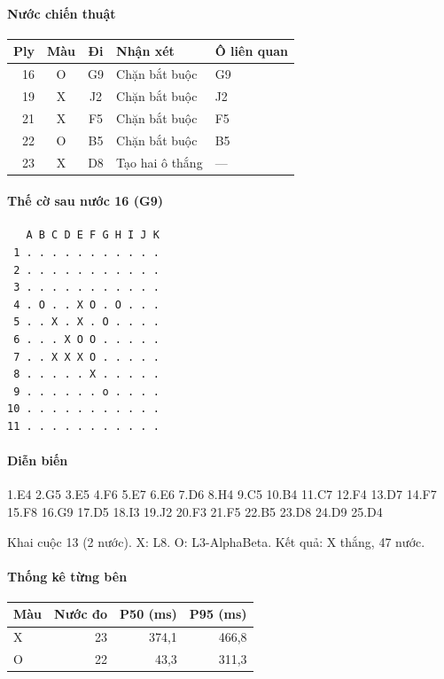 \paragraph{Nước chiến thuật}
\begin{center}\small
\begin{tabular}{@{}rccll@{}}
\toprule
Ply & Màu & Đi & Nhận xét & Ô liên quan \\
\midrule
16 & O & G9 & Chặn bắt buộc & G9 \\
19 & X & J2 & Chặn bắt buộc & J2 \\
21 & X & F5 & Chặn bắt buộc & F5 \\
22 & O & B5 & Chặn bắt buộc & B5 \\
23 & X & D8 & Tạo hai ô thắng & — \\
\bottomrule
\end{tabular}
\end{center}
\paragraph{Thế cờ sau nước 16 (G9)}
\begin{verbatim}
   A B C D E F G H I J K
 1 . . . . . . . . . . .
 2 . . . . . . . . . . .
 3 . . . . . . . . . . .
 4 . O . . X O . O . . .
 5 . . X . X . O . . . .
 6 . . . X O O . . . . .
 7 . . X X X O . . . . .
 8 . . . . . X . . . . .
 9 . . . . . . o . . . .
10 . . . . . . . . . . .
11 . . . . . . . . . . .
\end{verbatim}
\paragraph{Diễn biến}
{\footnotesize 1.E4 2.G5 3.E5 4.F6 5.E7 6.E6 7.D6 8.H4 9.C5 10.B4 11.C7 12.F4 13.D7 14.F7 15.F8 16.G9 17.D5 18.I3 19.J2 20.F3 21.F5 22.B5 23.D8 24.D9 25.D4\par}
Khai cuộc 13 (2 nước). X: L8. O: L3-AlphaBeta. Kết quả: X thắng, 47 nước.
\paragraph{Thống kê từng bên}
\begin{center}\small
\begin{tabular}{@{}lrrr@{}}
\toprule
Màu & Nước đo & P50 (ms) & P95 (ms) \\
\midrule
X & 23 & 374,1 & 466,8 \\
O & 22 & 43,3 & 311,3 \\
\bottomrule
\end{tabular}
\end{center}
